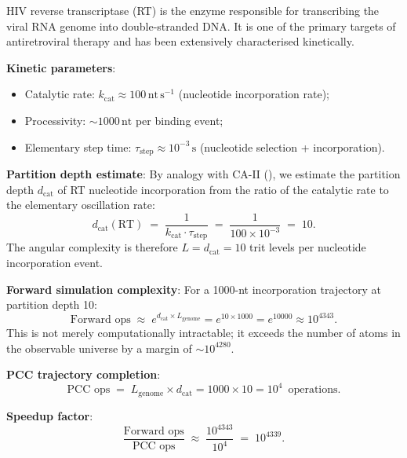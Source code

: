 HIV reverse transcriptase (RT) is the enzyme responsible for transcribing
the viral RNA genome into double-stranded DNA.  It is one of the primary
targets of antiretroviral therapy and has been extensively characterised
kinetically.

\medskip
\noindent\textbf{Kinetic parameters}:
\begin{itemize}
    \item Catalytic rate: $k_{\mathrm{cat}} \approx 100\,\mathrm{nt\,s}^{-1}$
          (nucleotide incorporation rate);
    \item Processivity: $\sim 1000\,\mathrm{nt}$ per binding event;
    \item Elementary step time: $\tau_{\mathrm{step}} \approx 10^{-3}\,\mathrm{s}$
          (nucleotide selection + incorporation).
\end{itemize}

\noindent\textbf{Partition depth estimate}:
By analogy with CA-II (), we estimate the partition
depth $d_{\mathrm{cat}}$ of RT nucleotide incorporation from the ratio of
the catalytic rate to the elementary oscillation rate:
\begin{equation}
\label{eq:ch05-rt-depth}
    d_{\mathrm{cat}}(\mathrm{RT})
    \;=\; \frac{1}{k_{\mathrm{cat}} \cdot \tau_{\mathrm{step}}}
    \;=\; \frac{1}{100 \times 10^{-3}}
    \;=\; 10.
\end{equation}
The angular complexity is therefore $L = d_{\mathrm{cat}} = 10$ trit
levels per nucleotide incorporation event.

\medskip
\noindent\textbf{Forward simulation complexity}: For a 1000-nt
incorporation trajectory at partition depth 10:
\begin{equation}
\label{eq:ch05-rt-forward}
    \text{Forward ops} \;\approx\;
    e^{d_{\mathrm{cat}} \times L_{\mathrm{genome}}}
    = e^{10 \times 1000}
    = e^{10000}
    \approx 10^{4343}.
\end{equation}
This is not merely computationally intractable; it exceeds the number of
atoms in the observable universe by a margin of $\sim 10^{4280}$.

\medskip
\noindent\textbf{PCC trajectory completion}:
\begin{equation}
\label{eq:ch05-rt-pcc}
    \text{PCC ops} \;=\; L_{\mathrm{genome}} \times d_{\mathrm{cat}}
    = 1000 \times 10 = 10^4\,\text{ operations}.
\end{equation}

\medskip
\noindent\textbf{Speedup factor}:
\begin{equation}
\label{eq:ch05-rt-speedup}
    \frac{\text{Forward ops}}{\text{PCC ops}}
    \;\approx\; \frac{10^{4343}}{10^4}
    \;=\; 10^{4339}.
\end{equation}

